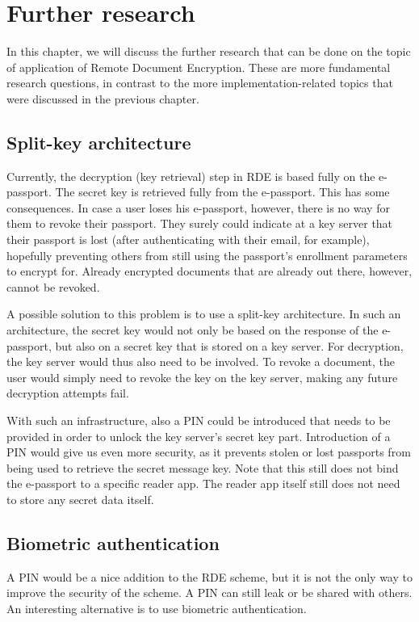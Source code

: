 \chapter{Further research}
\label{ch:further-research}
In this chapter, we will discuss the further research that can be done on the topic of application of Remote Document Encryption.
These are more fundamental research questions, in contrast to the more implementation-related topics that were discussed in the previous chapter.

\section{Split-key architecture}
\label{sec:split-key-architecture}
Currently, the decryption (key retrieval) step in RDE is based fully on the e-passport.
The secret key is retrieved fully from the e-passport.
This has some consequences.
In case a user loses his e-passport, however, there is no way for them to revoke their passport.
They surely could indicate at a key server that their passport is lost (after authenticating with their email, for example), hopefully preventing others from still using the passport's enrollment parameters to encrypt for.
Already encrypted documents that are already out there, however, cannot be revoked.

A possible solution to this problem is to use a split-key architecture.
In such an architecture, the secret key would not only be based on the response of the e-passport, but also on a secret key that is stored on a key server.
For decryption, the key server would thus also need to be involved.
To revoke a document, the user would simply need to revoke the key on the key server, making any future decryption attempts fail.

With such an infrastructure, also a PIN could be introduced that needs to be provided in order to unlock the key server's secret key part.
Introduction of a PIN would give us even more security, as it prevents stolen or lost passports from being used to retrieve the secret message key.
Note that this still does not bind the e-passport to a specific reader app.
The reader app itself still does not need to store any secret data itself.

\section{Biometric authentication}
\label{sec:biometric-authentication}
A PIN would be a nice addition to the RDE scheme, but it is not the only way to improve the security of the scheme.
A PIN can still leak or be shared with others.
An interesting alternative is to use biometric authentication.

